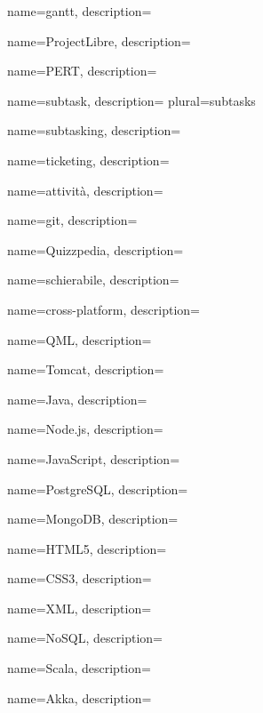  {
	name=gantt,
	description={\TODO{}}
}

 {
	name=ProjectLibre,
	description={\TODO{}}
}

 {
	name=PERT,
	description={\TODO{}}
}

 {
	name=subtask,
	description={\TODO{}}
	plural=subtasks
}

 {
	name=subtasking,
	description={\TODO{}}
}

 {
	name=ticketing,
	description={\TODO{}}
}

 {
	name=attività,
	description={\TODO{}}
}

 {
	name=git,
	description={\TODO{}}
}

 {
	name=Quizzpedia,
	description={\TODO{}}
}

 {
	name=schierabile,
	description={\TODO{}}
}

 {
	name=cross-platform,
	description={\TODO{}}
}

 {
	name=QML,
	description={\TODO{}}
}

 {
	name=Tomcat,
	description={\TODO{}}
}

 {
	name=Java,
	description={\TODO{}}
}

 {
	name=Node.js,
	description={\TODO{}}
}

 {
	name=JavaScript,
	description={\TODO{}}
}

 {
	name=PostgreSQL,
	description={\TODO{}}
}

 {
	name=MongoDB,
	description={\TODO{}}
}

 {
	name=HTML5,
	description={\TODO{}}
}

 {
	name=CSS3,
	description={\TODO{}}
}

 {
	name=XML,
	description={\TODO{}}
}

 {
	name=NoSQL,
	description={\TODO{}}
}

 {
	name=Scala,
	description={\TODO{}}
}

 {
	name=Akka,
	description={\TODO{}}
}

